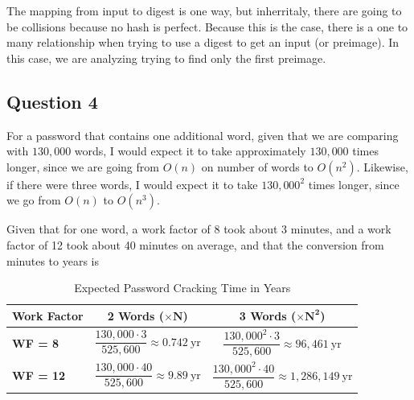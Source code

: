 \documentclass[11pt]{article}
\begin{document}
The mapping from input to digest is one way, but inherritaly, there are going to be collisions because no hash is perfect. Because this is the case, there is a one to many relationship when trying to use a digest to get an input (or preimage). In this case, we are analyzing trying to find only the first preimage.

\subsection*{Question 4}
For a password that contains one additional word, given that we are comparing with
\(130{,}000\) words, I would expect it to take approximately \(130{,}000\) times longer,
since we are going from \(O(n)\) on number of words to \(O(n^{2})\).
Likewise, if there were three words, I would expect it to take \(130{,}000^{2}\) times
longer, since we go from \(O(n)\) to \(O(n^{3})\).

Given that for one word, a work factor of 8 took about 3 minutes, and a work factor of 12
took about 40 minutes on average, and that the conversion from minutes to years is

\begin{table}[h!]
    \centering
    \caption{Expected Password Cracking Time in Years}
    \label{tab:results}
    \begin{tabular}{l c c}
        \toprule
        \textbf{Work Factor} & \textbf{2 Words ($\mathbf{\times N}$)} & \textbf{3 Words ($\mathbf{\times N^2}$)} \\
        \midrule
        \textbf{WF = 8} & $ \dfrac{130{,}000 \cdot 3}{525{,}600} \approx 0.742\ \mathrm{yr} $ & $ \dfrac{130{,}000^{2} \cdot 3}{525{,}600} \approx 96{,}461\ \mathrm{yr} $ \\
        \textbf{WF = 12} & $ \dfrac{130{,}000 \cdot 40}{525{,}600} \approx 9.89\ \mathrm{yr} $ & $ \dfrac{130{,}000^{2} \cdot 40}{525{,}600} \approx 1{,}286{,}149\ \mathrm{yr} $ \\
        \bottomrule
    \end{tabular}
\end{table}
\end{document}
